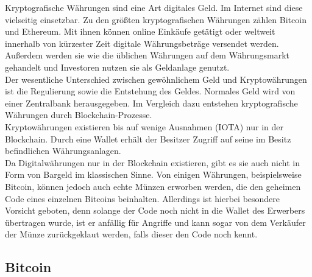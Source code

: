 		Kryptografische Währungen sind eine Art digitales Geld. Im Internet sind diese vielseitig einsetzbar. Zu den größten kryptografischen Währungen zählen Bitcoin und Ethereum. Mit ihnen können online Einkäufe getätigt oder weltweit innerhalb von kürzester Zeit digitale Währungsbeträge versendet werden. Außerdem werden sie wie die üblichen Währungen auf dem Währungsmarkt gehandelt und Investoren nutzen sie als Geldanlage genutzt.\\
		Der wesentliche Unterschied zwischen gewöhnlichem Geld und Kryptowährungen ist die Regulierung sowie die Entstehung des Geldes. Normales Geld wird von einer Zentralbank herausgegeben. Im Vergleich dazu entstehen kryptografische Währungen durch Blockchain-Prozesse. \\
		Kryptowährungen existieren bis auf wenige Ausnahmen (IOTA) nur in der Blockchain. Durch eine Wallet erhält der Besitzer Zugriff auf seine im Besitz befindlichen Währungsanlagen.\\
		Da Digitalwährungen nur in der Blockchain existieren, gibt es sie auch nicht in Form von Bargeld im klassischen Sinne. Von einigen Währungen, beispielsweise Bitcoin, können jedoch auch echte Münzen erworben werden, die den geheimen Code eines einzelnen Bitcoins beinhalten. Allerdings ist hierbei besondere Vorsicht geboten, denn solange der Code noch nicht in die Wallet des Erwerbers übertragen wurde, ist er anfällig für Angriffe und kann sogar von dem Verkäufer der Münze \glqq{}zurückgeklaut\grqq{} werden, falls dieser den Code noch kennt. \cite{kcur}	
		
	\subsection{Bitcoin}\label{subsec:bitcoin}	
	

